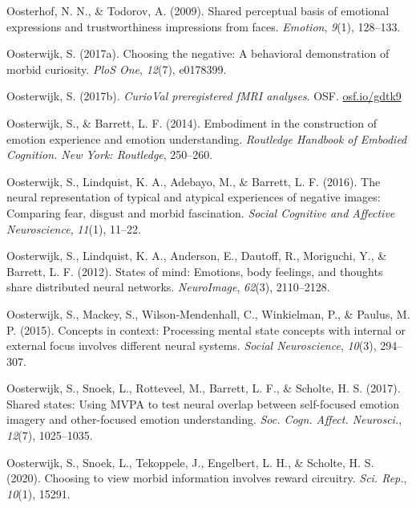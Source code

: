\documentclass[12pt,american,a4paper,oneside,]{memoir} %
\begin{document}
\leavevmode\hypertarget{ref-Oosterhof2009-mf}{}%
Oosterhof, N. N., \& Todorov, A. (2009). Shared perceptual basis of emotional expressions and trustworthiness impressions from faces. \emph{Emotion}, \emph{9}(1), 128--133.

\leavevmode\hypertarget{ref-oosterwijk2017choosing}{}%
Oosterwijk, S. (2017a). Choosing the negative: A behavioral demonstration of morbid curiosity. \emph{PloS One}, \emph{12}(7), e0178399.

\leavevmode\hypertarget{ref-oosterwijk2017prereg}{}%
Oosterwijk, S. (2017b). \emph{CurioVal preregistered fMRI analyses}. OSF. \url{osf.io/gdtk9}

\leavevmode\hypertarget{ref-oosterwijk2014embodiment}{}%
Oosterwijk, S., \& Barrett, L. F. (2014). Embodiment in the construction of emotion experience and emotion understanding. \emph{Routledge Handbook of Embodied Cognition. New York: Routledge}, 250--260.

\leavevmode\hypertarget{ref-oosterwijk2016neural}{}%
Oosterwijk, S., Lindquist, K. A., Adebayo, M., \& Barrett, L. F. (2016). The neural representation of typical and atypical experiences of negative images: Comparing fear, disgust and morbid fascination. \emph{Social Cognitive and Affective Neuroscience}, \emph{11}(1), 11--22.

\leavevmode\hypertarget{ref-oosterwijk2012states}{}%
Oosterwijk, S., Lindquist, K. A., Anderson, E., Dautoff, R., Moriguchi, Y., \& Barrett, L. F. (2012). States of mind: Emotions, body feelings, and thoughts share distributed neural networks. \emph{NeuroImage}, \emph{62}(3), 2110--2128.

\leavevmode\hypertarget{ref-oosterwijk2015concepts}{}%
Oosterwijk, S., Mackey, S., Wilson-Mendenhall, C., Winkielman, P., \& Paulus, M. P. (2015). Concepts in context: Processing mental state concepts with internal or external focus involves different neural systems. \emph{Social Neuroscience}, \emph{10}(3), 294--307.

\leavevmode\hypertarget{ref-Oosterwijk2017-sc}{}%
Oosterwijk, S., Snoek, L., Rotteveel, M., Barrett, L. F., \& Scholte, H. S. (2017). Shared states: Using MVPA to test neural overlap between self-focused emotion imagery and other-focused emotion understanding. \emph{Soc. Cogn. Affect. Neurosci.}, \emph{12}(7), 1025--1035.

\leavevmode\hypertarget{ref-Oosterwijk2020-uf}{}%
Oosterwijk, S., Snoek, L., Tekoppele, J., Engelbert, L. H., \& Scholte, H. S. (2020). Choosing to view morbid information involves reward circuitry. \emph{Sci. Rep.}, \emph{10}(1), 15291.
\end{document}
